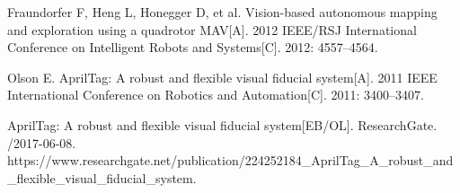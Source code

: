 \begin{thebibliography}{00}
     Fraundorfer F, Heng L, Honegger D, et al. Vision-based autonomous mapping and exploration using a quadrotor MAV[A]. 2012 IEEE/RSJ International Conference on Intelligent Robots and Systems[C]. 2012: 4557–4564.

     Olson E. AprilTag: A robust and flexible visual fiducial system[A]. 2011 IEEE International Conference on Robotics and Automation[C]. 2011: 3400–3407.

     AprilTag: A robust and flexible visual fiducial system[EB/OL]. ResearchGate. /2017-06-08. https://www.researchgate.net/publication/224252184_AprilTag_A_robust_and_flexible_visual_fiducial_system.









\thispagestyle{fancy}
\end{thebibliography}
